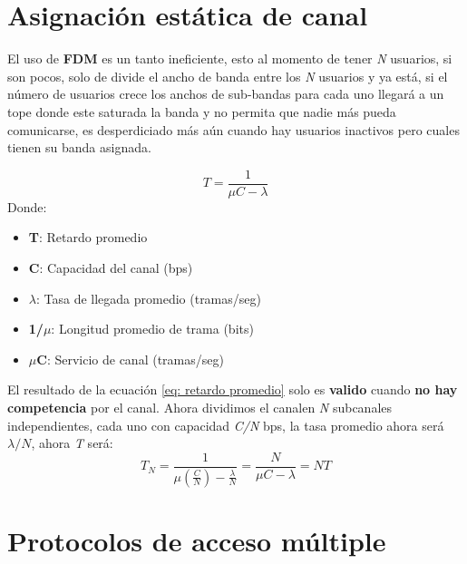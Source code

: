 \documentclass[
	12pt, %
	fleqn, %
	a4paper, %
]{LegrandOrangeBook}
\begin{document}
\section{Asignación estática de canal}
El uso de \textbf{FDM} es un tanto ineficiente, esto al momento de tener \textit{N} usuarios, si son pocos, solo de divide el ancho de banda entre los \textit{N} usuarios y ya está, si el número de usuarios crece los anchos de sub-bandas para cada uno llegará a un tope donde este saturada la banda y no permita que nadie más pueda comunicarse, es desperdiciado más aún cuando hay usuarios inactivos pero cuales tienen su banda asignada.
\begin{definition}
\begin{equation}
T=\frac{1}{\mu C - \lambda}
\label{eq: retardo promedio}
\end{equation}
Donde:
\begin{itemize}
\item \textbf{T}: Retardo promedio
\item \textbf{C}: Capacidad del canal (bps)
\item \textbf{$\lambda$}: Tasa de llegada promedio (tramas/seg)
\item \textbf{1/$\mu$}: Longitud promedio de trama (bits)
\item \textbf{$\mu$C}: Servicio de canal (tramas/seg)
\end{itemize}
El resultado de la ecuación \ref{eq: retardo promedio} solo es \textbf{valido} cuando \textbf{no hay competencia} por el canal. Ahora dividimos el canalen  \textit{N} subcanales independientes, cada uno con capacidad \textit{C/N} bps, la tasa promedio ahora será $\lambda/N$, ahora \textit{T} será:
\begin{equation}
T_N=\frac{1}{\mu(\frac{C}{N})-\frac{\lambda}{N}}=\frac{N}{\mu C-\lambda}=NT
\end{equation}
\end{definition}
\section{Protocolos de acceso múltiple}
\end{document}
